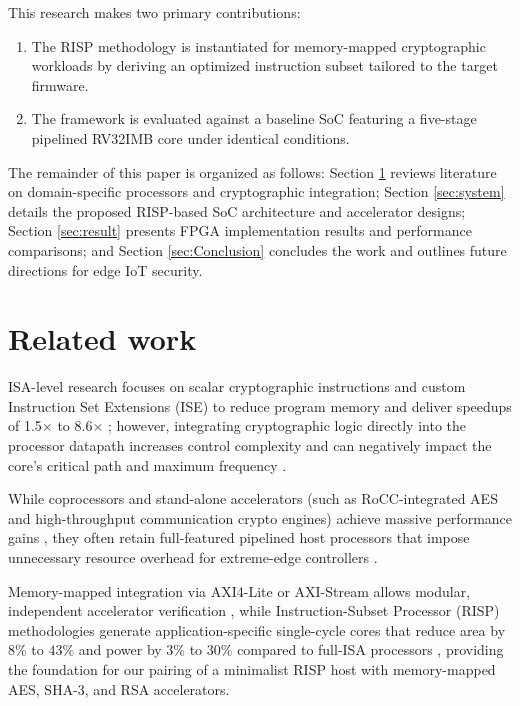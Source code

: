 This research makes two primary contributions:

\begin{enumerate}
    \item The RISP methodology is instantiated for memory-mapped cryptographic workloads by deriving an optimized instruction subset tailored to the target firmware.

    \item The framework is evaluated against a baseline SoC featuring a five-stage pipelined RV32IMB core under identical conditions.
\end{enumerate}

The remainder of this paper is organized as follows: Section \ref{sec:related} reviews literature on domain-specific processors and cryptographic integration; Section \ref{sec:system} details the proposed RISP-based SoC architecture and accelerator designs; Section \ref{sec:result} presents FPGA implementation results and performance comparisons; and Section \ref{sec:Conclusion} concludes the work and outlines future directions for edge IoT security.

\section{Related work}
\label{sec:related}

ISA-level research focuses on scalar cryptographic instructions and custom Instruction Set Extensions (ISE) to reduce program memory and deliver speedups of 1.5$\times$ to 8.6$\times$ \cite{cheng2023risc, marshall2021design, pham2026sha, pham2024secure, ignatius2024power, nicsanci2022symmetric}; however, integrating cryptographic logic directly into the processor datapath increases control complexity and can negatively impact the core's critical path and maximum frequency \cite{pham2024secure, ignatius2024power}.

While coprocessors and stand-alone accelerators (such as RoCC-integrated AES and high-throughput communication crypto engines) achieve massive performance gains \cite{gomes2022fac, pham2026sha, nannipieri2021risc, nicsanci2022symmetric, ma2023design, wang2021energy}, they often retain full-featured pipelined host processors that impose unnecessary resource overhead for extreme-edge controllers \cite{simola2024risc, cheng2023risc, ma2023design, gomes2022fac}.

Memory-mapped integration via AXI4-Lite or AXI-Stream allows modular, independent accelerator verification \cite{axinte2025embedded, simola2024risc, nasahl2021hector}, while Instruction-Subset Processor (RISP) methodologies generate application-specific single-cycle cores that reduce area by $8\%$ to $43\%$ and power by $3\%$ to $30\%$ compared to full-ISA processors \cite{raissp2025}, providing the foundation for our pairing of a minimalist RISP host with memory-mapped AES, SHA-3, and RSA accelerators.

